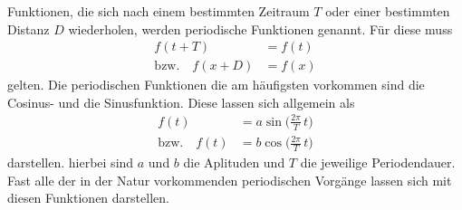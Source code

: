 Funktionen, die sich nach einem bestimmten Zeitraum $T$ oder einer bestimmten
Distanz $D$ wiederholen, werden periodische Funktionen genannt. Für diese muss
\begin{align}
  f(t + T) &= f(t) \\
  \text{bzw.}\quad f(x + D) &= f(x)
\end{align}
gelten. Die periodischen Funktionen die am häufigsten vorkommen sind die
Cosinus- und die Sinusfunktion. Diese lassen sich allgemein als
\begin{align}
  f(t) &= a\sin\biggl(\frac{2\pi}{T}\,t\biggr) \\
    \text{bzw.}\quad f(t) &= b\cos\biggl(\frac{2\pi}{T}\,t\biggr)
\end{align}
darstellen. hierbei sind $a$ und $b$ die Aplituden und $T$ die jeweilige
Periodendauer. Fast alle der in der Natur vorkommenden periodischen Vorgänge
lassen sich mit diesen Funktionen darstellen.
